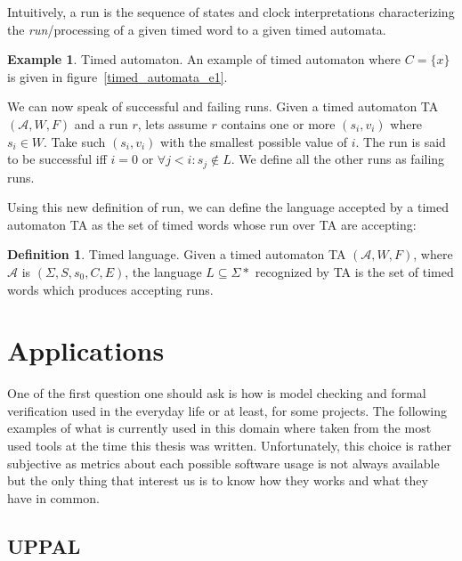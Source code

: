 \documentclass[12pt]{article}
\theoremstyle{definition}
\newtheorem{definition}{Definition}[section]
\theoremstyle{definition}
\newtheorem{example}{Example}[section]
\theoremstyle{remark}
\newcommand{\A}{\mathcal{A}}
\begin{document}
Intuitively, a run is the sequence of states and clock interpretations characterizing the \textit{run}/processing of a given timed word to a given timed automata.

\theoremstyle{definition}
\begin{example}{Timed automaton.} An example of timed automaton where $C = \{x\}$ is given in figure~\ref{timed_automata_e1}.
\end{example}

We can now speak of successful and failing runs. Given a timed automaton TA $(\A, W, F)$ and a run $r$, lets assume $r$ contains one or more $(s_i, v_i)$ where $s_i \in W$. Take such $(s_i, v_i)$ with the smallest possible value of $i$. The run is said to be successful iff $i = 0$ or $\forall j < i: s_j \notin L$. We define all the other runs as failing runs.

Using this new definition of run, we can define the language accepted by a timed automaton TA as the set of timed words whose run over TA are accepting:

\theoremstyle{definition}
\begin{definition}{Timed language.} Given a timed automaton TA $(\A, W, F)$, where $\A$ is $(\Sigma, S, s_{0},C, E)$, the language $L \subseteq \Sigma*$ recognized by TA is the set of timed words which produces accepting runs.
\end{definition}



\section{Applications}


One of the first question one should ask is how is model checking and formal verification used in the everyday life or at least, for some projects. The following examples of what is currently used in this domain where taken from the most used tools at the time this thesis was written. Unfortunately, this choice is rather subjective as metrics about each possible software usage is not always available but the only thing that interest us is to know how they works and what they have in common.


\subsection{UPPAL}
\end{document}
